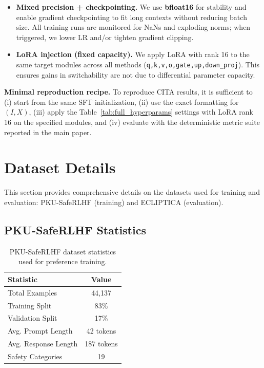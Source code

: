 \begin{itemize}[leftmargin=*,itemsep=2.5pt]
    \item \textbf{Mixed precision + checkpointing.}
    We use \textbf{bfloat16} for stability and enable gradient checkpointing to fit long contexts without reducing batch size.
    All training runs are monitored for NaNs and exploding norms; when triggered, we lower LR and/or tighten gradient clipping.

    \item \textbf{LoRA injection (fixed capacity).}
    We apply LoRA with rank 16 to the same target modules across all methods (\texttt{q,k,v,o,gate,up,down\_proj}).
    This ensures gains in switchability are not due to differential parameter capacity.
\end{itemize}

\vspace{-0.25em}
\noindent
\textbf{Minimal reproduction recipe.}
To reproduce \textsc{CITA} results, it is sufficient to (i) start from the same SFT initialization, (ii) use the exact formatting for $(I,X)$, (iii) apply the Table~\ref{tab:full_hyperparams} settings with LoRA rank 16 on the specified modules, and (iv) evaluate with the deterministic metric suite reported in the main paper.




\section{Dataset Details}
\label{sec:appendix_dataset}

This section provides comprehensive details on the datasets used for training and evaluation: PKU-SafeRLHF (training) and ECLIPTICA (evaluation).

\subsection{PKU-SafeRLHF Statistics}

\begin{table}[H]
\centering
\small
\renewcommand{\arraystretch}{1.2}
\begin{tabular}{@{}lc@{}}
\toprule
\textbf{Statistic} & \textbf{Value} \\
\midrule
Total Examples & 44,137 \\ \hline
Training Split & 83\% \\ \hline
Validation Split & 17\% \\ \hline
Avg. Prompt Length & 42 tokens \\ \hline
Avg. Response Length & 187 tokens \\ \hline
Safety Categories & 19 \\
\bottomrule
\end{tabular}
\caption{PKU-SafeRLHF dataset statistics used for preference training.}
\label{tab:pku_stats}
\end{table}


